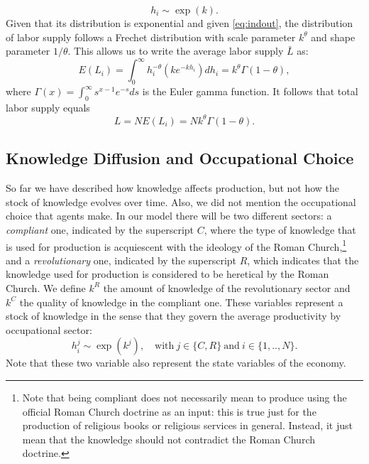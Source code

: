 \begin{equation*}
h_i\sim \exp(k).
\end{equation*}
Given that its distribution is exponential and given \ref{eq:indout}, the distribution of labor supply follows a Frechet distribution with scale parameter $k^\theta$ and shape parameter $1/\theta$. This allows us to write the average labor supply $\bar{L}$ as:
\begin{equation}
E(L_i)=\int_0^\infty h^{-\theta}_i (k e^{-k h_i})dh_i=k^{\theta}\Gamma(1-\theta),
\end{equation}
where $\Gamma(x)=\int_0^\infty s^{x-1} e^{-s}ds$ is the Euler gamma function. It follows that total labor supply equals
\begin{equation}
L=N E(L_i)=N k^{\theta} \Gamma(1-\theta).
\end{equation}
\subsection{Knowledge Diffusion and Occupational Choice}
So far we have described how knowledge affects production, but not how the stock of knowledge evolves over time. Also, we did not mention the occupational choice that agents make. In our model there will be two different sectors: a \textit{compliant} one, indicated by the superscript $C$, where the type of knowledge that is used for production is acquiescent with the ideology of the Roman Church,\footnote{Note that being compliant does not necessarily mean to produce using the official Roman Church doctrine as an input: this is true just for the production of religious books or religious services in general. Instead, it just mean that the knowledge should not contradict the Roman Church doctrine.} and a \textit{revolutionary} one, indicated by the superscript $R$, which indicates that the knowledge used for production is considered to be heretical by the Roman Church.
We define $k^R$ the amount of knowledge of the revolutionary sector and  $k^C$ the quality of knowledge in the compliant one. These variables represent a stock of knowledge in the sense that they govern the average productivity by occupational sector:
\begin{equation}
h^j_i \sim \exp(k^j), \quad \text{with} \ j\in \{C,R\} \ \text{and} \ i\in \{1,..,N\}.
\end{equation}
Note that these two variable also represent the state variables of the economy.

